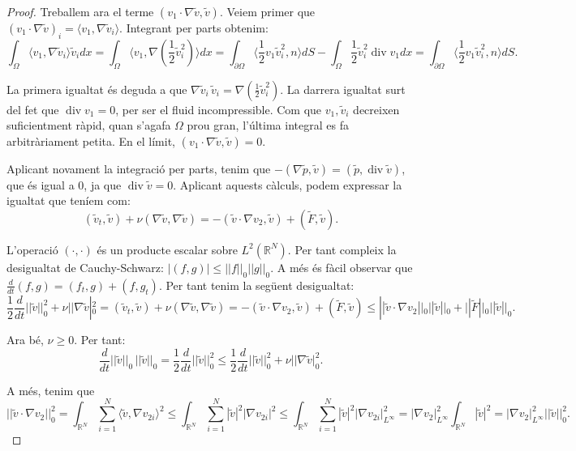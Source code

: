 \documentclass{article}
\numberwithin{equation}{section}
\DeclareMathOperator{\diver}{div}
\begin{document}
\begin{proof}
Treballem ara el terme $(v_1\cdot\nabla\tilde{v},\tilde{v})$. Veiem primer que $(v_1\cdot\nabla\tilde{v})_i=\langle v_1,\nabla\tilde{v}_i\rangle$. Integrant per parts obtenim:
\[\int_{\Omega}\langle v_1,\nabla\tilde{v}_i\rangle\tilde{v}_idx=\int_{\Omega}\langle v_1,\nabla\left(\frac{1}{2}\tilde{v}_i^2\right)\rangle dx=\int_{\partial\Omega}\langle\frac{1}{2}v_1\tilde{v}_i^2,n\rangle dS-\int_{\Omega}\frac{1}{2}\tilde{v}_i^2\diver v_1dx=\int_{\partial\Omega}\langle\frac{1}{2}v_1\tilde{v}_i^2,n\rangle dS.\]

La primera igualtat \'{e}s deguda a que $\nabla\tilde{v}_i\,\tilde{v}_i=\nabla(\frac{1}{2}\tilde{v}_i^2)$. La darrera igualtat surt del fet que $\diver v_1=0$, per ser el fluid incompressible. Com que $v_1,\tilde{v}_i$ decreixen suficientment r\`{a}pid, quan s'agafa $\Omega$ prou gran, l'\'{u}ltima integral es fa arbitr\`{a}riament petita. En el l\'{i}mit, $(v_1\cdot\nabla\tilde{v},\tilde{v})=0$.

Aplicant novament la integraci\'{o} per parts, tenim que $-(\nabla\tilde{p},\tilde{v})=(\tilde{p},\diver\tilde{v})$, que \'{e}s igual a $0$, ja que $\diver\tilde{v}=0$. Aplicant aquests c\`{a}lculs, podem expressar la igualtat que ten\'{i}em com:
\[(\tilde{v}_t,\tilde{v})+\nu(\nabla\tilde{v},\nabla\tilde{v})=-(\tilde{v}\cdot\nabla v_2,\tilde{v})+(\tilde{F},\tilde{v}).\]

L'operaci\'{o} $(\cdot,\cdot)$ \'{e}s un producte escalar sobre $L^2(\mathbb{R}^N)$. Per tant compleix la desigualtat de Cauchy-Schwarz: $|(f,g)|\leq||f||_0||g||_0$. A m\'{e}s \'{e}s f\`{a}cil observar que $\frac{d}{dt}(f,g)=(f_t,g)+(f,g_t)$. Per tant tenim la seg\"{u}ent desigualtat:
\[\frac{1}{2}\frac{d}{dt}||\tilde{v}||_0^2+\nu||\nabla\tilde{v}|_0^2=(\tilde{v}_t,\tilde{v})+\nu(\nabla\tilde{v},\nabla\tilde{v})=-(\tilde{v}\cdot\nabla v_2,\tilde{v})+(\tilde{F},\tilde{v})\leq||\tilde{v}\cdot\nabla v_2||_0||\tilde{v}||_0+||\tilde{F}||_0||\tilde{v}||_0.\]

Ara b\'{e}, $\nu\geq0$. Per tant:
\[\frac{d}{dt}||\tilde{v}||_0\,||\tilde{v}||_0=\frac{1}{2}\frac{d}{dt}||\tilde{v}||_0^2\leq\frac{1}{2}\frac{d}{dt}||\tilde{v}||_0^2+\nu||\nabla\tilde{v}|_0^2.\]

A m\'{e}s, tenim que
\[||\tilde{v}\cdot\nabla v_2||_0^2=\int_{\mathbb{R}^N}\sum_{i=1}^N\langle\tilde{v},\nabla v_{2i}\rangle^2\leq\int_{\mathbb{R}^N}\sum_{i=1}^N|\tilde{v}|^2|\nabla v_{2i}|^2\leq\int_{\mathbb{R}^N}\sum_{i=1}^N|\tilde{v}|^2|\nabla v_{2i}|_{L^{\infty}}^2=|\nabla v_2|_{L^{\infty}}^2\int_{\mathbb{R}^N}|\tilde{v}|^2=|\nabla v_2|_{L^{\infty}}^2||\tilde{v}||_0^2.\]


\end{proof}
\end{document}
